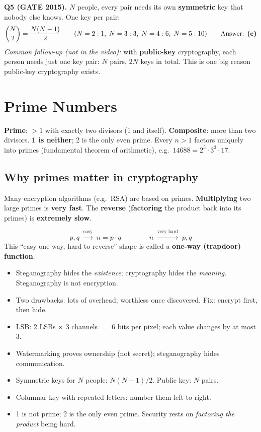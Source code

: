 \textbf{Q5 (GATE 2015).} $N$ people, every pair needs its own \textbf{symmetric} key that nobody else knows. One key per pair:
\[
\binom{N}{2} = \frac{N(N-1)}{2} \qquad (N=2: 1,\; N=3: 3,\; N=4: 6,\; N=5: 10) \qquad\text{Answer: \textbf{(c)}}
\]
{\small\emph{Common follow-up (not in the video):} with \textbf{public-key} cryptography, each person needs just one key pair: $N$ pairs, $2N$ keys in total. This is one big reason public-key cryptography exists.}

\section{Prime Numbers}
\begin{keybox}
\textbf{Prime}: $> 1$ with exactly two divisors (1 and itself). \textbf{Composite}: more than two divisors. \textbf{1 is neither}; 2 is the only even prime. Every $n > 1$ factors uniquely into primes (fundamental theorem of arithmetic), e.g.\ $14688 = 2^5 \cdot 3^3 \cdot 17$.
\end{keybox}
\subsection{Why primes matter in cryptography}
\begin{keybox}
Many encryption algorithms (e.g.\ RSA) are based on primes. \textbf{Multiplying} two large primes is \textbf{very fast}. The \textbf{reverse} (\textbf{factoring} the product back into its primes) is \textbf{extremely slow}.
\end{keybox}
\[
p, q \;\xrightarrow{\text{easy}}\; n = p \cdot q \qquad\qquad n \;\xrightarrow{\text{very hard}}\; p, q
\]
This ``easy one way, hard to reverse'' shape is called a \textbf{one-way (trapdoor) function}.


\begin{examtip}
\begin{itemize}
  \item Steganography hides the \emph{existence}; cryptography hides the \emph{meaning}. Steganography is not encryption.
  \item Two drawbacks: lots of overhead; worthless once discovered. Fix: encrypt first, then hide.
  \item LSB: 2 LSBs $\times$ 3 channels $=$ 6 bits per pixel; each value changes by at most 3.
  \item Watermarking proves ownership (not secret); steganography hides communication.
  \item Symmetric keys for $N$ people: $N(N-1)/2$. Public key: $N$ pairs.
  \item Columnar key with repeated letters: number them left to right.
  \item 1 is not prime; 2 is the only even prime. Security rests on \emph{factoring the product} being hard.
\end{itemize}
\end{examtip}

